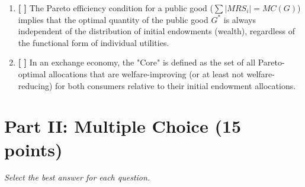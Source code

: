 \documentclass[12pt, a4paper]{article}
\begin{document}
\begin{enumerate}
    \item \textbf{[ \quad ]} The Pareto efficiency condition for a public good ($\sum |MRS_i| = MC(G)$) implies that the optimal quantity of the public good $G^*$ is always independent of the distribution of initial endowments (wealth), regardless of the functional form of individual utilities.
    
    \item \textbf{[ \quad ]} In an exchange economy, the "Core" is defined as the set of all Pareto-optimal allocations that are welfare-improving (or at least not welfare-reducing) for both consumers relative to their initial endowment allocations.

\end{enumerate}

\section*{Part II: Multiple Choice (15 points)}
\textit{Select the best answer for each question.}
\end{document}
